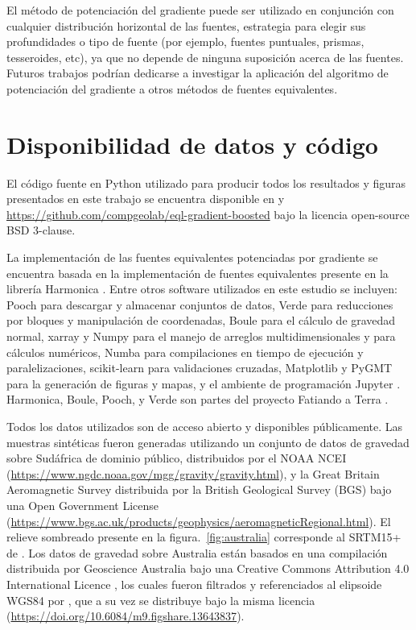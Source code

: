 El método de potenciación del gradiente puede ser utilizado en conjunción con
cualquier distribución horizontal de las fuentes, estrategia para elegir sus
profundidades o tipo de fuente (por ejemplo, fuentes puntuales, prismas,
tesseroides, etc), ya que no depende de ninguna suposición acerca de las
fuentes.
Futuros trabajos podrían dedicarse a investigar la aplicación del algoritmo de
potenciación del gradiente a otros métodos de fuentes equivalentes.


\section{Disponibilidad de datos y código}

El código fuente en Python utilizado para producir todos los resultados
y figuras presentados en este trabajo se encuentra disponible en
\citet{soler2021b} y \url{https://github.com/compgeolab/eql-gradient-boosted}
bajo la licencia open-source BSD 3-clause.

La implementación de las fuentes equivalentes potenciadas por gradiente se
encuentra basada en la implementación de fuentes equivalentes presente en la
librería Harmonica \citep{harmonica2021}.
Entre otros software utilizados en este estudio se incluyen:
Pooch \citep{pooch2020} para descargar y almacenar conjuntos de datos,
Verde \citep{verde2018} para reducciones por bloques y manipulación de
coordenadas,
Boule \citep{boule2020} para el cálculo de gravedad normal,
xarray \citep{xarray2017} y Numpy \citep{numpy2020}
para el manejo de arreglos multidimensionales y para cálculos numéricos,
Numba \citep{numba2015} para compilaciones en tiempo de ejecución
y paralelizaciones,
scikit-learn \citep{sklearn2011} para validaciones cruzadas,
Matplotlib \citep{matplotlib2007} y PyGMT \citep{pygmt2020}
para la generación de figuras y mapas,
y el ambiente de programación Jupyter \citep{jupyter2016}.
Harmonica, Boule, Pooch, y Verde son partes del proyecto Fatiando a Terra
\citep{fatiando2013}.

Todos los datos utilizados son de acceso abierto y disponibles públicamente.
Las muestras sintéticas fueron generadas utilizando un conjunto de datos de
gravedad sobre Sudáfrica de dominio público, distribuidos por el
NOAA NCEI (\url{https://www.ngdc.noaa.gov/mgg/gravity/gravity.html}),
y la Great Britain Aeromagnetic Survey distribuida por la
British Geological Survey (BGS) bajo una Open Government License
(\url{https://www.bgs.ac.uk/products/geophysics/aeromagneticRegional.html}).
El relieve sombreado presente en la figura.~\ref{fig:australia} corresponde al
SRTM15+ de \citet{tozer2019}.
Los datos de gravedad sobre Australia están basados en una compilación
distribuida por Geoscience Australia bajo una Creative Commons Attribution 4.0
International Licence \citep{wynne2018}, los cuales fueron filtrados
y referenciados al elipsoide WGS84 por \citet{australia_compilation}, que a su
vez se distribuye bajo la misma licencia
(\url{https://doi.org/10.6084/m9.figshare.13643837}).


